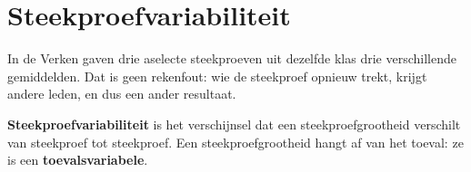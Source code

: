 \section{Steekproefvariabiliteit}

In de Verken gaven drie aselecte steekproeven uit dezelfde klas drie verschillende gemiddelden. Dat is geen rekenfout: wie de steekproef opnieuw trekt, krijgt andere leden, en dus een ander resultaat.

\begin{theorie}
\textbf{\textcolor{accent}{Steekproefvariabiliteit}} is het verschijnsel dat een steekproefgrootheid verschilt van steekproef tot steekproef. Een steekproefgrootheid hangt af van het toeval: ze is een \textbf{\textcolor{accent}{toevalsvariabele}}.
\end{theorie}

